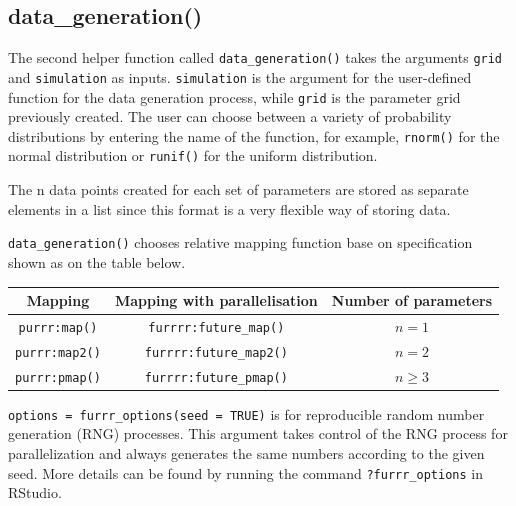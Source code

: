 \documentclass[11pt,a4paper]{article}
\begin{document}
\hypertarget{data_generation}{%
\subsection{data\_generation()}\label{data_generation}}

The second helper function called \texttt{data\_generation()} takes the
arguments \texttt{grid} and \texttt{simulation} as inputs.
\texttt{simulation} is the argument for the user-defined function for
the data generation process, while \texttt{grid} is the parameter grid
previously created. The user can choose between a variety of probability
distributions by entering the name of the function, for example,
\texttt{rnorm()} for the normal distribution or \texttt{runif()} for the
uniform distribution.

The n data points created for each set of parameters are stored as
separate elements in a list since this format is a very flexible way of
storing data.

\texttt{data\_generation()} chooses relative mapping function base on
specification shown as on the table below.

\begin{longtable}[]{@{}ccc@{}}
\toprule()
Mapping & Mapping with parallelisation & Number of parameters \\
\midrule()
\endhead
\texttt{purrr:map()} & \texttt{furrrr:future\_map()} & \(n = 1\) \\
\texttt{purrr:map2()} & \texttt{furrrr:future\_map2()} & \(n = 2\) \\
\texttt{purrr:pmap()} & \texttt{furrrr:future\_pmap()} & \(n \geq 3\) \\
\bottomrule()
\end{longtable}

\texttt{options\ =\ furrr\_options(seed\ =\ TRUE)} is for reproducible
random number generation (RNG) processes. This argument takes control of
the RNG process for parallelization and always generates the same
numbers according to the given seed. More details can be found by
running the command \texttt{?furrr\_options} in RStudio.
\end{document}

